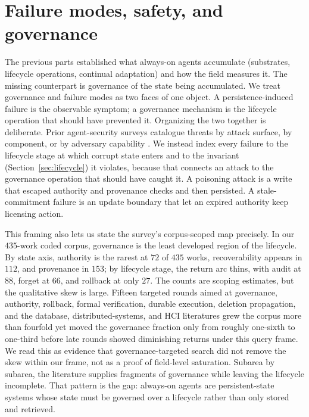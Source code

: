 \section{Failure modes, safety, and governance}\label{sec:failures}


The previous parts established what always-on agents accumulate (substrates, lifecycle operations, continual adaptation) and how the field measures it. The missing counterpart is governance of the state being accumulated. We treat governance and failure modes as two faces of one object. A persistence-induced failure is the observable symptom; a governance mechanism is the lifecycle operation that should have prevented it. Organizing the two together is deliberate. Prior agent-security surveys catalogue threats by attack surface, by component, or by adversary capability \citep{chu2026systematicsurveyagentsecurity,lin2026surveylongtermmemorysecurity}. We instead index every failure to the lifecycle stage at which corrupt state enters and to the invariant (Section~\ref{sec:lifecycle}) it violates, because that connects an attack to the governance operation that should have caught it. A poisoning attack is a write that escaped authority and provenance checks and then persisted. A stale-commitment failure is an update boundary that let an expired authority keep licensing action.

This framing also lets us state the survey's corpus-scoped map precisely. In our $435$-work coded corpus, governance is the least developed region of the lifecycle. By state axis, authority is the rarest at $72$ of $435$ works, recoverability appears in $112$, and provenance in $153$; by lifecycle stage, the return arc thins, with audit at $88$, forget at $66$, and rollback at only $27$. The counts are scoping estimates, but the qualitative skew is large. Fifteen targeted rounds aimed at governance, authority, rollback, formal verification, durable execution, deletion propagation, and the database, distributed-systems, and HCI literatures grew the corpus more than fourfold yet moved the governance fraction only from roughly one-sixth to one-third before late rounds showed diminishing returns under this query frame. We read this as evidence that governance-targeted search did not remove the skew within our frame, not as a proof of field-level saturation. Subarea by subarea, the literature supplies fragments of governance while leaving the lifecycle incomplete. That pattern is the gap: always-on agents are persistent-state systems whose state must be governed over a lifecycle rather than only stored and retrieved.

